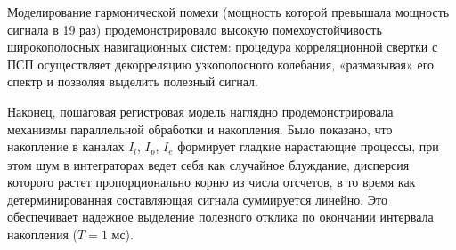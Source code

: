 Моделирование гармонической помехи (мощность которой превышала мощность сигнала в 19 раз) продемонстрировало высокую помехоустойчивость широкополосных навигационных систем: процедура корреляционной свертки с ПСП осуществляет декорреляцию узкополосного колебания, «размазывая» его спектр и позволяя выделить полезный сигнал.

Наконец, пошаговая регистровая модель наглядно продемонстрировала механизмы параллельной обработки и накопления. Было показано, что накопление в каналах \(I_l\), \(I_p\), \(I_e\) формирует гладкие нарастающие процессы, при этом шум в интеграторах ведет себя как случайное блуждание, дисперсия которого растет пропорционально корню из числа отсчетов, в то время как детерминированная составляющая сигнала суммируется линейно. Это обеспечивает надежное выделение полезного отклика по окончании интервала накопления (\(T = 1\text{ мс}\)).